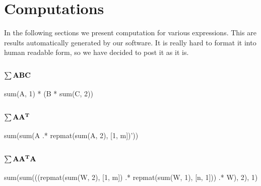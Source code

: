 \documentclass{article}
\begin{document}
 



\section{Computations}

In the following sections we present computation for various expressions.
This are results automatically generated by our software.
It is really hard to format it into human readable form, so we have decided
to post it as it is.

\subsection{{$\bf \sum ABC$}}
sum(A, 1) * (B * sum(C, 2))


\subsection{{$\bf \sum AA^T$}}
sum(sum(A .* repmat(sum(A, 2), [1, m])'))

\subsection{{$\bf \sum AA^TA$}}
sum(sum(((repmat(sum(W, 2), [1, m]) .* repmat(sum(W, 1), [n, 1])) .* W), 2), 1) 
\end{document}
